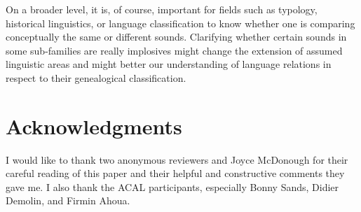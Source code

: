 \documentclass[output=paper]{LSP/langsci}
\begin{document}
On a  broader level,  it is, of course, important for fields such as typology, historical linguistics, or language classification to know whether one is comparing conceptually the same or different sounds. Clarifying whether certain sounds in some  sub-families are really implosives might change the extension of assumed linguistic areas and might better our understanding of language relations in respect to their genealogical classification.



 \section*{Acknowledgments}

I would like to thank two anonymous reviewers and Joyce McDonough for their careful reading of this paper and their helpful and constructive comments they gave me. I also thank the ACAL participants, especially Bonny Sands, Didier Demolin, and Firmin Ahoua.


\sloppy
\printbibliography[heading=subbibliography,notkeyword=this]
\end{document}
